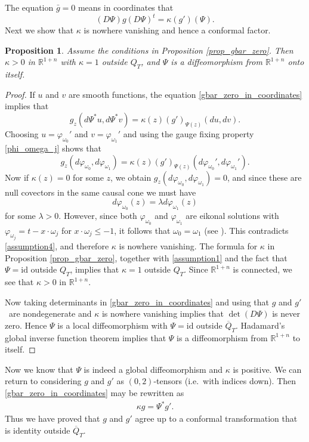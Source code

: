 \documentclass[11pt,letterpaper]{amsart}
\newtheorem{Proposition}[Theorem]{Proposition}
\theoremstyle{definition}
\numberwithin{equation}{section}
\newcommand{\mR}{\mathbb{R}}                    %
\newcommand{\ol}[1]{\overline{#1}}
\newcommand{\id}{\mathrm{id}}
\begin{document}
The equation $\bar{g} = 0$ means in coordinates that 
\begin{equation} \label{gbar_zero_in_coordinates}
(D\Psi) g (D\Psi)^t = \kappa(g')(\Psi).
\end{equation}
Next we show that $\kappa$ is nowhere vanishing and hence a conformal factor.

\begin{Proposition}
Assume the conditions in Proposition \ref{prop_gbar_zero}. Then $\kappa > 0$ in $\mR^{1+n}$ with $\kappa = 1$ outside $Q_T$, and $\Psi$ is a diffeomorphism from $\mR^{1+n}$ onto itself.
\end{Proposition}
\begin{proof}
If $u$ and $v$ are smooth functions, the equation \eqref{gbar_zero_in_coordinates} implies that 
\[
g_z(d\Psi^* u, d\Psi^* v) = \kappa(z) (g')_{\Psi(z)}(du, dv).
\]
Choosing $u = \varphi_{\omega_0}'$ and $v = \varphi_{\omega_1}'$ and using the gauge fixing property \eqref{phi_omega_j} shows that 
\[
g_z(d \varphi_{\omega_0}, d\varphi_{\omega_1}) = \kappa(z) (g')_{\Psi(z)}(d\varphi_{\omega_0}', d\varphi_{\omega_1}').
\]
Now if $\kappa(z) = 0$ for some $z$, we obtain $g_z(d \varphi_{\omega_0}, d\varphi_{\omega_1}) = 0$, and since these are null covectors in the same causal cone we must have 
\[
d\varphi_{\omega_0}(z) = \lambda d\varphi_{\omega_1}(z)
\]
for some $\lambda > 0$. However, since both $\varphi_{\omega_0}$ and $\varphi_{\omega_1}$ are eikonal solutions with $\varphi_{\omega_j} = t - x \cdot \omega_j$ for $x \cdot \omega_j \leq -1$, it follows that $\omega_0 = \omega_1$ (see \cite[Proposition 4.1]{oksanen2024}). This contradicts \eqref{assumption4}, and therefore $\kappa$ is nowhere vanishing. The formula for $\kappa$ in Proposition \ref{prop_gbar_zero}, together with \eqref{assumption1} and the fact that $\Psi = \id$ outside $Q_T$, implies that $\kappa = 1$ outside $Q_T$. Since $\mR^{1+n}$ is connected, we see that $\kappa > 0$ in $\mR^{1+n}$.

Now taking determinants in \eqref{gbar_zero_in_coordinates} and using that $g$ and $g'$ are nondegenerate and $\kappa$ is nowhere vanishing implies that $\det(D\Psi)$ is never zero. Hence $\Psi$ is a local diffeomorphism with $\Psi = \id$ outside $\ol{Q}_T$. Hadamard's global inverse function theorem \cite[Theorem 6.2.8]{krantz2002} implies that $\Psi$ is a diffeomorphism from $\mR^{1+n}$ to itself.
\end{proof}

Now we know that $\Psi$ is indeed a global diffeomorphism and $\kappa$ is positive. We can return to considering $g$ and $g'$ as $(0,2)$-tensors (i.e.\ with indices down). Then \eqref{gbar_zero_in_coordinates} may be rewritten as 
    \begin{align}\label{eq_kappa_Psi}
\kappa g = \Psi^* g'.
    \end{align}
Thus we have proved that $g$ and $g'$ agree up to a conformal transformation that is identity outside $\ol{Q}_T$.
\end{document}
